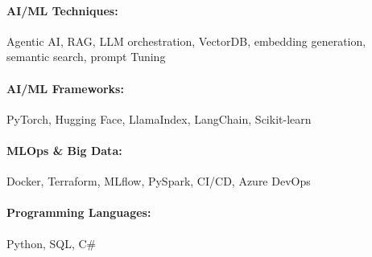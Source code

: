 \documentclass[10pt, letterpaper]{article}
\newenvironment{highlights}{
    \begin{itemize}[
        topsep=0.10 cm,
        parsep=0.10 cm,
        partopsep=0pt,
        itemsep=0pt,
        leftmargin=0 cm + 10pt
    ]
}{
    \end{itemize}
} %
\newenvironment{onecolentry}{
    \begin{adjustwidth}{
        0 cm + 0.00001 cm
    }{
        0 cm + 0.00001 cm
    }
}{
    \end{adjustwidth}
} %
\begin{document}
        \paragraph{AI/ML Techniques:} Agentic AI, RAG, LLM orchestration, VectorDB, embedding generation, semantic search, prompt Tuning
        \vspace{-4mm}
        \paragraph{AI/ML Frameworks:} PyTorch, Hugging Face, LlamaIndex, LangChain, Scikit-learn
        \vspace{-4mm}
        \paragraph{MLOps \& Big Data:} Docker, Terraform, MLflow, PySpark, CI/CD, Azure DevOps
        \vspace{-4mm}
        \paragraph{Programming Languages:} Python, SQL, C\#

    
        

\end{document}
